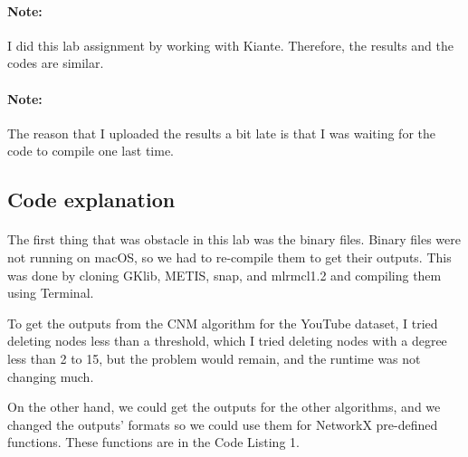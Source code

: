 \documentclass[letterpaper, 11pt]{article}
\newcommand{\1}{\mathds{1}}	%
\theoremstyle{definition}
\begin{document}
\paragraph{Note:}I did this lab assignment by working with Kiante. Therefore, the results and the codes are similar.
\paragraph{Note:}The reason that I uploaded the results a bit late is that I was waiting for the code to compile one last time.
\subsection*{Code explanation}

\paragraph{}The first thing that was obstacle in this lab was the binary files. Binary files were not running on macOS, so we had to re-compile them to get their outputs. This was done by cloning GKlib, METIS, snap, and mlrmcl1.2 and compiling them using Terminal.

To get the outputs from the CNM algorithm for the YouTube dataset, I tried deleting nodes less than a threshold, which I tried deleting nodes with a degree less than 2 to 15, but the problem would remain, and the runtime was not changing much.

On the other hand, we could get the outputs for the other algorithms, and we changed the outputs' formats so we could use them for NetworkX pre-defined functions. These functions are in the Code Listing 1.
\end{document}
